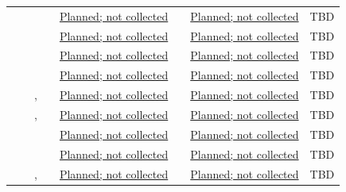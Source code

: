 \begin{landscape}
\begin{tabularx}{\linewidth}{L{1.7cm}L{2.3cm}L{2.5cm}L{1.8cm}YL{1.8cm}YL{1.4cm}}
 &  &  &  & \hyperref[PlannedEvidence:VER-014]{Planned; not collected} &  & \hyperref[PlannedEvidence:VAL-004]{Planned; not collected} & TBD\\
 &  &  &  & \hyperref[PlannedEvidence:VER-014]{Planned; not collected} &  & \hyperref[PlannedEvidence:VAL-005]{Planned; not collected} & TBD\\
 &  &  &  & \hyperref[PlannedEvidence:VER-015]{Planned; not collected} &  & \hyperref[PlannedEvidence:VAL-005]{Planned; not collected} & TBD\\
 &  &  &  & \hyperref[PlannedEvidence:VER-015]{Planned; not collected} &  & \hyperref[PlannedEvidence:VAL-007]{Planned; not collected} & TBD\\
 &  & ,  &  & \hyperref[PlannedEvidence:VER-016]{Planned; not collected} &  & \hyperref[PlannedEvidence:VAL-004]{Planned; not collected} & TBD\\
 &  & ,  &  & \hyperref[PlannedEvidence:VER-016]{Planned; not collected} &  & \hyperref[PlannedEvidence:VAL-007]{Planned; not collected} & TBD\\
 &  &  &  & \hyperref[PlannedEvidence:VER-017]{Planned; not collected} &  & \hyperref[PlannedEvidence:VAL-005]{Planned; not collected} & TBD\\
 &  &  &  & \hyperref[PlannedEvidence:VER-017]{Planned; not collected} &  & \hyperref[PlannedEvidence:VAL-007]{Planned; not collected} & TBD\\
 &  & ,  &  & \hyperref[PlannedEvidence:VER-018]{Planned; not collected} &  & \hyperref[PlannedEvidence:VAL-007]{Planned; not collected} & TBD\\

\end{tabularx}
\end{landscape}
